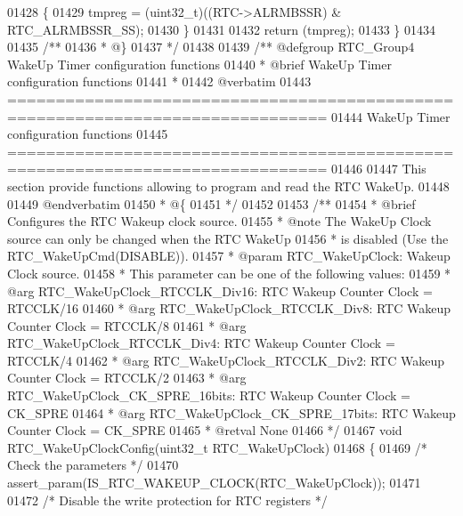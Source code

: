 \begin{DoxyCode}
01428   \{
01429     tmpreg = (uint32\_t)((RTC->ALRMBSSR) & RTC_ALRMBSSR_SS);
01430   \}
01431 
01432   \textcolor{keywordflow}{return} (tmpreg);
01433 \}
01434 
01435 \textcolor{comment}{/**}
01436 \textcolor{comment}{  * @\}}
01437 \textcolor{comment}{  */}
01438 
01439 \textcolor{comment}{/** @defgroup RTC\_Group4 WakeUp Timer configuration functions}
01440 \textcolor{comment}{ *  @brief   WakeUp Timer configuration functions }
01441 \textcolor{comment}{ *}
01442 \textcolor{comment}{@verbatim   }
01443 \textcolor{comment}{ ===============================================================================}
01444 \textcolor{comment}{                     WakeUp Timer configuration functions}
01445 \textcolor{comment}{ ===============================================================================  }
01446 \textcolor{comment}{}
01447 \textcolor{comment}{  This section provide functions allowing to program and read the RTC WakeUp.}
01448 \textcolor{comment}{}
01449 \textcolor{comment}{@endverbatim}
01450 \textcolor{comment}{  * @\{}
01451 \textcolor{comment}{  */}
01452 
01453 \textcolor{comment}{/**}
01454 \textcolor{comment}{  * @brief  Configures the RTC Wakeup clock source.}
01455 \textcolor{comment}{  * @note   The WakeUp Clock source can only be changed when the RTC WakeUp}
01456 \textcolor{comment}{  *         is disabled (Use the RTC\_WakeUpCmd(DISABLE)).      }
01457 \textcolor{comment}{  * @param  RTC\_WakeUpClock: Wakeup Clock source.}
01458 \textcolor{comment}{  *          This parameter can be one of the following values:}
01459 \textcolor{comment}{  *            @arg RTC\_WakeUpClock\_RTCCLK\_Div16: RTC Wakeup Counter Clock = RTCCLK/16}
01460 \textcolor{comment}{  *            @arg RTC\_WakeUpClock\_RTCCLK\_Div8: RTC Wakeup Counter Clock = RTCCLK/8}
01461 \textcolor{comment}{  *            @arg RTC\_WakeUpClock\_RTCCLK\_Div4: RTC Wakeup Counter Clock = RTCCLK/4}
01462 \textcolor{comment}{  *            @arg RTC\_WakeUpClock\_RTCCLK\_Div2: RTC Wakeup Counter Clock = RTCCLK/2}
01463 \textcolor{comment}{  *            @arg RTC\_WakeUpClock\_CK\_SPRE\_16bits: RTC Wakeup Counter Clock = CK\_SPRE}
01464 \textcolor{comment}{  *            @arg RTC\_WakeUpClock\_CK\_SPRE\_17bits: RTC Wakeup Counter Clock = CK\_SPRE}
01465 \textcolor{comment}{  * @retval None}
01466 \textcolor{comment}{  */}
01467 \textcolor{keywordtype}{void} RTC_WakeUpClockConfig(uint32\_t RTC\_WakeUpClock)
01468 \{
01469   \textcolor{comment}{/* Check the parameters */}
01470   assert_param(IS\_RTC\_WAKEUP\_CLOCK(RTC\_WakeUpClock));
01471 
01472   \textcolor{comment}{/* Disable the write protection for RTC registers */}

\end{DoxyCode}
